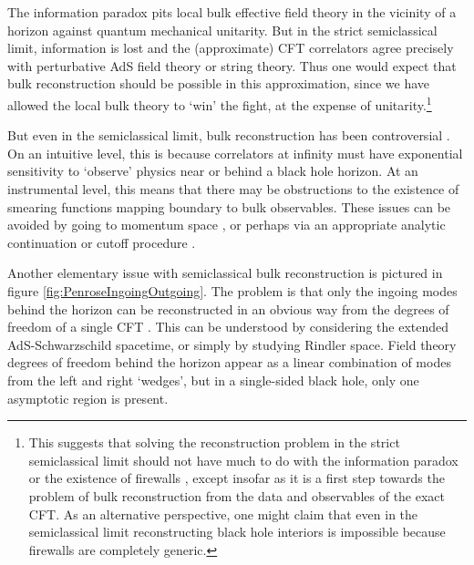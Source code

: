 The information paradox pits local bulk effective field theory in the vicinity of a horizon against quantum mechanical unitarity.  But in the strict semiclassical limit, information is lost and the (approximate) CFT correlators agree precisely with perturbative  AdS field theory or string theory.  Thus one would expect that bulk reconstruction should be possible in this approximation, since we have allowed the local bulk theory to `win' the fight, at the expense of unitarity.\footnote{This suggests that solving the reconstruction problem in the strict semiclassical limit should not have much to do with the information paradox or the existence of firewalls \cite{Almheiri:2012rt}, except insofar as it is a first step towards the problem of bulk reconstruction from the data and observables of the exact CFT.  As an alternative perspective, one might claim that even in the semiclassical limit reconstructing black hole interiors is impossible because firewalls are completely generic.}  

But even in the semiclassical limit, bulk reconstruction has been controversial \cite{Hamilton:2005ju, Bousso:2012mh, Leichenauer:2013kaa, Morrison:2014jha}.  On an intuitive level, this is because correlators at infinity must have exponential sensitivity to `observe' physics near or behind a black hole horizon.  At an instrumental level, this means that there may be obstructions to the existence of smearing functions mapping boundary to bulk observables.  These issues can be avoided by going to momentum space \cite{Papadodimas:2012aq, Papadodimas:2013jku}, or perhaps via an appropriate analytic continuation \cite{Hamilton:2005ju} or cutoff procedure \cite{Morrison:2014jha}.

Another elementary issue with semiclassical bulk reconstruction is  pictured in figure \ref{fig:PenroseIngoingOutgoing}.  The problem is that only the ingoing modes behind the horizon can be reconstructed in an obvious way from the degrees of freedom of a single CFT \cite{Hamilton:2005ju}.  This can be understood by considering the extended AdS-Schwarzschild spacetime, or simply by studying  Rindler space.  Field theory degrees of freedom behind the horizon appear as a linear combination of modes from the left and right `wedges', but in a single-sided black hole, only one asymptotic region is present.  



